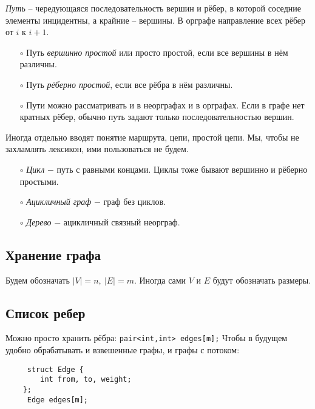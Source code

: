 \begin{definition}
    \textit{Путь} – чередующаяся последовательность вершин и рёбер, в которой соседние элементы инцидентны, а крайние – вершины. В орграфе направление всех рёбер от $i$ к $i+1$.
\end{definition}

\begin{enumerate}
    \item[$\circ$] Путь \textit{вершинно простой} или просто простой, если все вершины в нём различны.
    \item[$\circ$] Путь \textit{рёберно простой}, если все рёбра в нём различны.
    \item[$\circ$] Пути можно рассматривать и в неорграфах и в орграфах. Если в графе нет кратных рёбер, обычно путь задают только последовательностью вершин.
\end{enumerate}

\begin{remark}
    Иногда отдельно вводят понятие маршрута, цепи, простой цепи. Мы, чтобы не захламлять лексикон, ими пользоваться не будем.
\end{remark}

\begin{enumerate}
    \item[$\circ$] \textit{Цикл} $-$ путь с равными концами. Циклы тоже бывают вершинно и рёберно простыми.
    \item[$\circ$] \textit{Ацикличный граф} $-$ граф без циклов.
    \item[$\circ$] \textit{Дерево} $-$ ацикличный связный неорграф.
\end{enumerate}

\subsection{Хранение графа}
Будем обозначать $|V|=n,\ |E|=m$. Иногда сами $V$ и $E$ будут обозначать размеры.

\subsection*{Список ребер}

Можно просто хранить рёбра:
\lstinline!pair<int,int> edges[m];!
Чтобы в будущем удобно обрабатывать и взвешенные графы, и графы с потоком:

\begin{lstlisting}
     struct Edge {
        int from, to, weight;
    };
     Edge edges[m];
\end{lstlisting}

